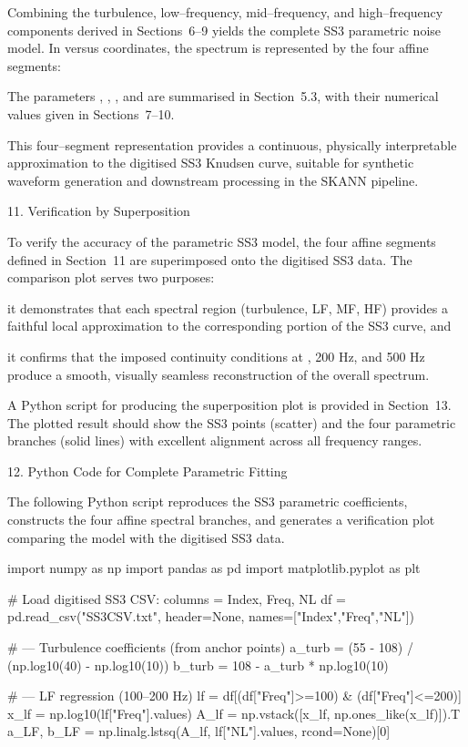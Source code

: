 \documentclass[12pt]{article}
\begin{document}
Combining the turbulence, low–frequency, mid–frequency, and high–frequency components derived in Sections 6–9 yields the complete SS3 parametric noise model. In  versus  coordinates, the spectrum is represented by the four affine segments:


The parameters , , , and  are summarised in Section 5.3, with their numerical values given in Sections 7–10.

This four–segment representation provides a continuous, physically interpretable approximation to the digitised SS3 Knudsen curve, suitable for synthetic waveform generation and downstream processing in the SKANN pipeline.

11. Verification by Superposition

To verify the accuracy of the parametric SS3 model, the four affine segments defined in Section 11 are superimposed onto the digitised SS3 data. The comparison plot serves two purposes:

it demonstrates that each spectral region (turbulence, LF, MF, HF) provides a faithful local approximation to the corresponding portion of the SS3 curve, and

it confirms that the imposed continuity conditions at , 200 Hz, and 500 Hz produce a smooth, visually seamless reconstruction of the overall spectrum.

A Python script for producing the superposition plot is provided in Section 13. The plotted result should show the SS3 points (scatter) and the four parametric branches (solid lines) with excellent alignment across all frequency ranges.

12. Python Code for Complete Parametric Fitting

The following Python script reproduces the SS3 parametric coefficients, constructs the four affine spectral branches, and generates a verification plot comparing the model with the digitised SS3 data.

import numpy as np
import pandas as pd
import matplotlib.pyplot as plt

\# Load digitised SS3 CSV: columns = Index, Freq, NL
df = pd.read_csv("SS3CSV.txt", header=None, names=["Index","Freq","NL"])

\# --- Turbulence coefficients (from anchor points)
a_turb = (55 - 108) / (np.log10(40) - np.log10(10))
b_turb = 108 - a_turb * np.log10(10)

\# --- LF regression (100--200 Hz)
lf = df[(df["Freq"]>=100) \& (df["Freq"]<=200)]
x_lf = np.log10(lf["Freq"].values)
A_lf = np.vstack([x_lf, np.ones_like(x_lf)]).T
a_LF, b_LF = np.linalg.lstsq(A_lf, lf["NL"].values, rcond=None)[0]
\end{document}
